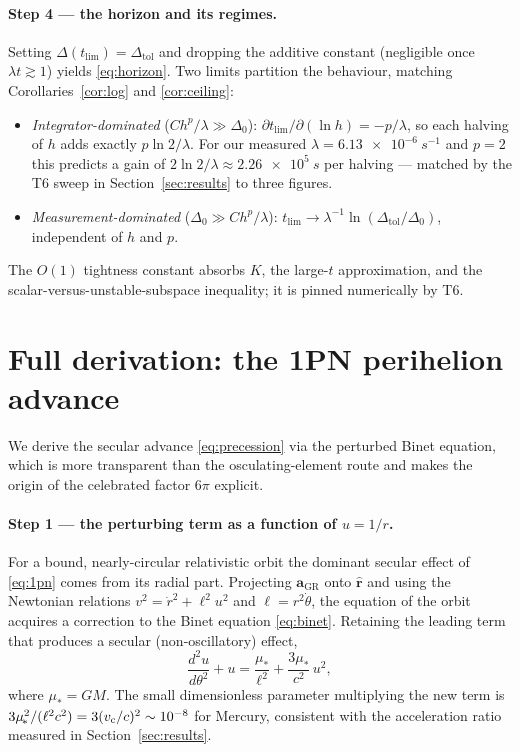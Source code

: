 \documentclass[11pt]{article}
\theoremstyle{definition}
\begin{document}
\paragraph{Step 4 --- the horizon and its regimes.}
Setting $\Delta(t_{\mathrm{lim}}) = \Delta_{\mathrm{tol}}$ and dropping the
additive constant (negligible once $\lambda t \gtrsim 1$) yields
\eqref{eq:horizon}. Two limits partition the behaviour, matching
Corollaries~\ref{cor:log} and \ref{cor:ceiling}:
\begin{itemize}
\item \emph{Integrator-dominated} ($C h^{p}/\lambda \gg \Delta_0$):
$\partial t_{\mathrm{lim}}/\partial(\ln h) = -p/\lambda$, so each halving of
$h$ adds exactly $p\ln 2/\lambda$. For our measured
$\lambda = \SI{6.13e-6}{s^{-1}}$ and $p=2$ this predicts a gain of
$2\ln2/\lambda \approx \SI{2.26e5}{s}$ per halving --- matched by the T6 sweep
in Section~\ref{sec:results} to three figures.
\item \emph{Measurement-dominated} ($\Delta_0 \gg C h^{p}/\lambda$):
$t_{\mathrm{lim}} \to \lambda^{-1}\ln(\Delta_{\mathrm{tol}}/\Delta_0)$,
independent of $h$ and $p$.
\end{itemize}
The $O(1)$ tightness constant absorbs $K$, the large-$t$ approximation, and the
scalar-versus-unstable-subspace inequality; it is pinned numerically by T6.

\section{Full derivation: the 1PN perihelion advance}
\label{app:precession}

We derive the secular advance \eqref{eq:precession} via the perturbed Binet
equation, which is more transparent than the osculating-element route and makes
the origin of the celebrated factor $6\pi$ explicit.

\paragraph{Step 1 --- the perturbing term as a function of $u=1/r$.}
For a bound, nearly-circular relativistic orbit the dominant secular effect of
\eqref{eq:1pn} comes from its radial part. Projecting $\mathbf a_{\mathrm{GR}}$
onto $\hat{\mathbf r}$ and using the Newtonian relations $v^2 = \dot r^2 +
\ell^2 u^2$ and $\ell = r^2\dot\theta$, the equation of the orbit acquires a
correction to the Binet equation \eqref{eq:binet}. Retaining the leading term
that produces a secular (non-oscillatory) effect,
\begin{equation}
\frac{d^2u}{d\theta^2} + u = \frac{\mu_{\!*}}{\ell^2}
+ \frac{3\mu_{\!*}}{c^2}\,u^2,
\label{eq:binet-gr}
\end{equation}
where $\mu_{\!*} = GM$. The small dimensionless parameter multiplying the new
term is $3\mu_{\!*}^2/(\ell^2 c^2) = 3(v_{\rm c}/c)^2 \sim 10^{-8}$ for Mercury,
consistent with the acceleration ratio measured in Section~\ref{sec:results}.
\end{document}
